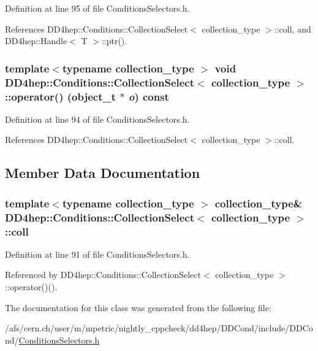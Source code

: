 Definition at line 95 of file ConditionsSelectors.h.

References DD4hep::Conditions::CollectionSelect$<$ collection\_\-type $>$::coll, and DD4hep::Handle$<$ T $>$::ptr().\hypertarget{class_d_d4hep_1_1_conditions_1_1_collection_select_ac8308f7a0fabe85fcc10901e49f363b8}{
\subsubsection[{operator()}]{\setlength{\rightskip}{0pt plus 5cm}template$<$typename collection\_\-type $>$ void {\bf DD4hep::Conditions::CollectionSelect}$<$ collection\_\-type $>$::operator() ({\bf object\_\-t} $\ast$ {\em o}) const}}
\label{class_d_d4hep_1_1_conditions_1_1_collection_select_ac8308f7a0fabe85fcc10901e49f363b8}


Definition at line 94 of file ConditionsSelectors.h.

References DD4hep::Conditions::CollectionSelect$<$ collection\_\-type $>$::coll.

\subsection{Member Data Documentation}
\hypertarget{class_d_d4hep_1_1_conditions_1_1_collection_select_add9428a8c7577a9d09c7148c4ba1fcd9}{
\subsubsection[{coll}]{\setlength{\rightskip}{0pt plus 5cm}template$<$typename collection\_\-type $>$ collection\_\-type\& {\bf DD4hep::Conditions::CollectionSelect}$<$ collection\_\-type $>$::{\bf coll}}}
\label{class_d_d4hep_1_1_conditions_1_1_collection_select_add9428a8c7577a9d09c7148c4ba1fcd9}


Definition at line 91 of file ConditionsSelectors.h.

Referenced by DD4hep::Conditions::CollectionSelect$<$ collection\_\-type $>$::operator()().

The documentation for this class was generated from the following file:\begin{DoxyCompactItemize}
\item 
/afs/cern.ch/user/m/mpetric/nightly\_\-cppcheck/dd4hep/DDCond/include/DDCond/\hyperlink{_conditions_selectors_8h}{ConditionsSelectors.h}\end{DoxyCompactItemize}
